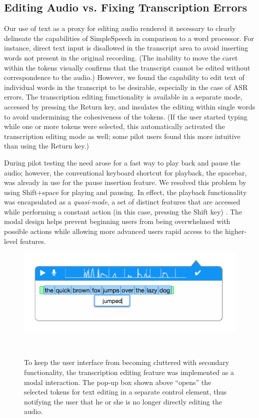 \subsection{Editing Audio vs. Fixing Transcription Errors}
Our use of text as a proxy for editing audio rendered it necessary to clearly delineate the capabilities of SimpleSpeech in comparison to a word processor.
For instance, direct text input is disallowed in the transcript area to avoid inserting words not present in the original recording.
(The inability to move the caret within the tokens visually confirms that the transcript cannot be edited without correspondence to the audio.)
However, we found the capability to edit text of individual words in the transcript to be desirable, especially in the case of ASR errors.
The transcription editing functionality is available in a separate mode, accessed by pressing the Return key, and insulates the editing within single words to avoid undermining the cohesiveness of the tokens. 
(If the user started typing while one or more tokens were selected, this automatically activated the transcription editing mode as well; some pilot users found this more intuitive than using the Return key.)

During pilot testing the need arose for a fast way to play back and pause the audio; however, the conventional keyboard shortcut for playback, the spacebar, was already in use for the pause insertion feature.
We resolved this problem by using Shift+space for playing and pausing.
In effect, the playback functionality was encapsulated as a \emph{quasi-mode}, a set of distinct features that are accessed while performing a constant action (in this case, pressing the Shift key) \cite{raskin}. 
The modal design helps prevent beginning users from being overwhelmed with possible actions while allowing more advanced users rapid access to the higher-level features.

\begin{figure}
	\centering
	\includegraphics[width=\columnwidth,keepaspectratio]{figures/transcription_edit}
	\caption{To keep the user interface from becoming cluttered with secondary functionality, the transcription editing feature was implemented as a modal interaction. The pop-up box shown above ``opens'' the selected tokens for text editing in a separate control element, thus notifying the user that he or she is no longer directly editing the audio.}~\label{fig:transcription}
\end{figure}


